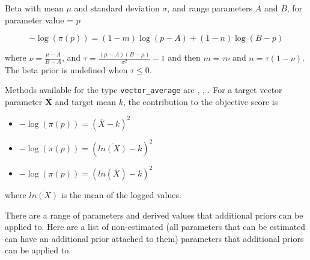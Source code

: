 \begin{itemize}
	{Beta with mean $\mu$ and standard deviation $\sigma$, and range parameters $A$ and $B$, for parameter value = $p$}

	\begin{equation}
	- \log \left(\pi \left( p \right) \right) = \left( 1 - m \right) \log \left( p - A \right) + \left( 1 - n \right)\log \left( B - p \right)
	\end{equation}

	where $\nu  = \frac{\mu  - A}{B - A}$, and $\tau = \frac{\left(\mu -A \right)\left(B - \mu \right)}{\sigma ^2} - 1$ and then $m=\tau \nu$ and $n=\tau(1-\nu)$. The beta prior is undefined when $\tau \leq 0$.
\end{itemize}

Methods available for the type \texttt{vector\_average} are , , . For a target vector parameter $\textbf{X}$ and target mean $k$, the contribution to the objective score is

\begin{itemize}
	\item {}

	$- \log \left(\pi \left(p \right) \right) = \left(\bar{X} - k\right)^2$

	\item {}

	$- \log \left(\pi \left(p \right) \right) = \left(\overline{ln\left(X\right)} - k\right)^2$

	\item {}

	$- \log \left(\pi \left(p \right) \right) = \left(ln\left(\bar{X}\right) - k\right)^2$
\end{itemize}

where $\overline{ln\left(X\right)}$ is the mean of the logged values.

There are a range of parameters and derived values that additional priors can be applied to. Here are a list of non-estimated (all parameters that can be estimated can have an additional prior attached to them) parameters that additional priors can be applied to.

